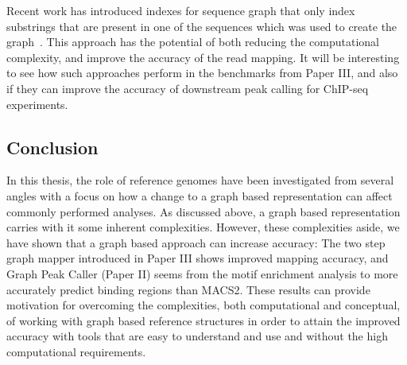 Recent work has introduced indexes for sequence graph that only index substrings that are present in one of the sequences which was used to create the graph~\cite{haplotypeaware}.
This approach has the potential of both reducing the computational complexity, and improve the accuracy of the read mapping.
It will be interesting to see how such approaches perform in the benchmarks from Paper III, and also if they can improve the accuracy of downstream peak calling for ChIP-seq experiments.

\subsection{Conclusion}
In this thesis, the role of reference genomes have been investigated from several angles with a focus on how a change to a graph based representation can affect commonly performed analyses.
As discussed above, a graph based representation carries with it some inherent complexities.
However, these complexities aside, we have shown that a graph based approach can increase accuracy: The two step graph mapper introduced in Paper III shows improved mapping accuracy, and Graph Peak Caller (Paper II) seems from the motif enrichment analysis to more accurately predict binding regions than MACS2.
These results can provide motivation for overcoming the complexities, both computational and conceptual, of working with graph based reference structures in order to attain the improved accuracy with tools that are easy to understand and use and without the high computational requirements.

